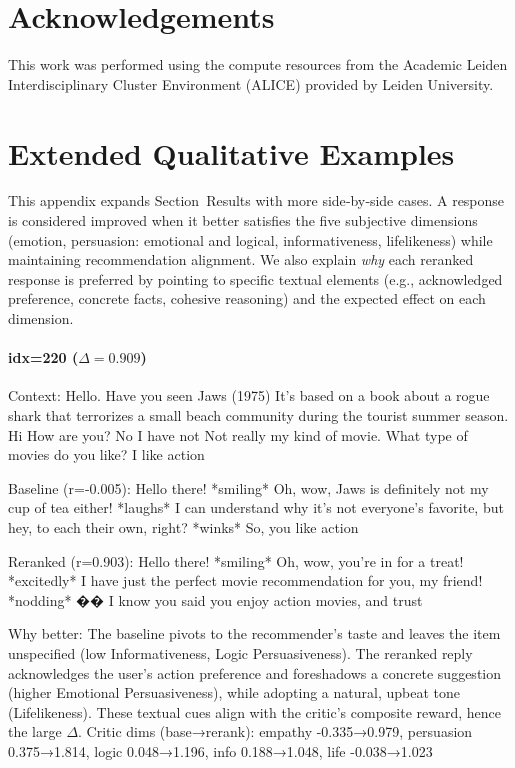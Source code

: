 \documentclass[12pt]{article}
\begin{document}
  \nocite{*}

  \section*{Acknowledgements}
  This work was performed using the compute resources from the Academic Leiden Interdisciplinary Cluster Environment (ALICE) provided by Leiden University.

  
  
  
  \appendix
  \section{Extended Qualitative Examples}
  This appendix expands Section~Results with more side‑by‑side cases. A response is considered improved when it better satisfies the five subjective dimensions (emotion, persuasion: emotional and logical, informativeness, lifelikeness) while maintaining recommendation alignment. We also explain \emph{why} each reranked response is preferred by pointing to specific textual elements (e.g., acknowledged preference, concrete facts, cohesive reasoning) and the expected effect on each dimension.
  
  \paragraph{idx=220 ($\Delta=0.909$)}
  \begin{center}
  \begin{qexample}
  Context: Hello. Have you seen Jaws (1975) It's based on a book about a rogue shark that terrorizes a small beach community during the tourist summer season. Hi How are you? No I have not Not really my kind of movie. What type of movies do you like? I like action
  
  Baseline (r=-0.005): Hello there! *smiling* Oh, wow, Jaws is definitely not my cup of tea either! *laughs* I can understand why it's not everyone's favorite, but hey, to each their own, right? *winks*  So, you like action

  Reranked (r=0.903): Hello there! *smiling* Oh, wow, you're in for a treat! *excitedly* I have just the perfect movie recommendation for you, my friend! *nodding* ��  I know you said you enjoy action movies, and trust
  \end{qexample}
  \end{center}
  Why better: The baseline pivots to the recommender's taste and leaves the item unspecified (low Informativeness, Logic Persuasiveness). The reranked reply acknowledges the user's action preference and foreshadows a concrete suggestion (higher Emotional Persuasiveness), while adopting a natural, upbeat tone (Lifelikeness). These textual cues align with the critic's composite reward, hence the large \(\Delta\).
  Critic dims (base→rerank): empathy -0.335→0.979, persuasion 0.375→1.814, logic 0.048→1.196, info 0.188→1.048, life -0.038→1.023
  
\end{document}
